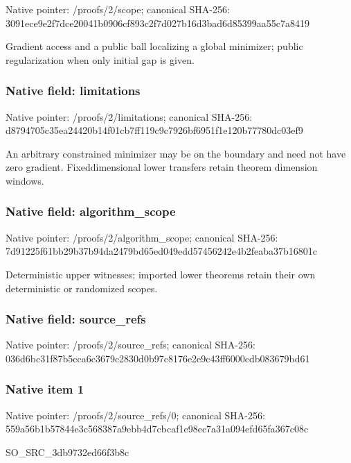 \documentclass[10pt,a4paper]{article}
\begin{document}
Native pointer: /proofs/2/scope; canonical SHA-256: 3091ece9e2f7dce20041b090\allowbreak{}6cf893c2f7d027b16d3bad6d\allowbreak{}85399aa55c7a8419


Gradient access and a public ball localizing a global minimizer; public regularization when only initial gap is given.


\subsubsection{Native field: limitations}


Native pointer: /proofs/2/limitations; canonical SHA-256: d8794705c35ea24420b14f01\allowbreak{}cb7ff119c9c7926bf6951f1e\allowbreak{}120b77780dc03ef9


An arbitrary constrained minimizer may be on the boundary and need not have zero gradient. Fixeddimensional lower transfers retain theorem dimension windows.


\subsubsection{Native field: algorithm\_scope}


Native pointer: /proofs/2/algorithm\_scope; canonical SHA-256: 7d91225f61bb29b37b94da24\allowbreak{}79bd65ed049edd57456242e4\allowbreak{}b2feaba37b16801c


Deterministic upper witnesses; imported lower theorems retain their own deterministic or randomized scopes.


\subsubsection{Native field: source\_refs}


Native pointer: /proofs/2/source\_refs; canonical SHA-256: 036d6bc31f87b5cca6c3679c\allowbreak{}2830d0b97c8176e2e9c43ff6\allowbreak{}000cdb083679bd61



\subsubsection{Native item 1}


Native pointer: /proofs/2/source\_refs/0; canonical SHA-256: 559a56b1b57844e3c568387a\allowbreak{}9ebb4d7cbcaf1e98ec7a31a0\allowbreak{}94efd65fa367c08c


SO\_SRC\_3db9732ed66f3b8c
\end{document}
